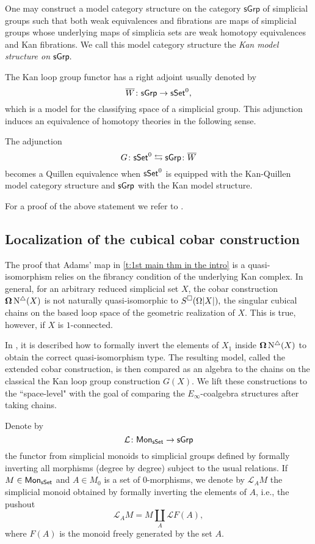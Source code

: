 One may construct a model category structure on the category $\mathsf{sGrp}$ of simplicial groups such that 
both weak equivalences and fibrations are maps of simplicial groups whose underlying maps of simplicia sets are weak homotopy equivalences and Kan fibrations. We call this model category structure the \textit{Kan model structure on $\mathsf{sGrp}.$}

The Kan loop group functor has a right adjoint usually denoted by 
$$\overline{W} \colon \mathsf{sGrp} \to \mathsf{sSet}^0,$$ which is a model for the classifying space of a simplicial group. This adjunction induces an equivalence of homotopy theories in the following sense.


\begin{theorem} \label{kan}
The adjunction
		$$G \colon \mathsf{sSet}^0 \leftrightarrows \mathsf{sGrp}\colon \overline{W}$$
		becomes a Quillen equivalence when $\mathsf{sSet}^0$ is equipped with the Kan-Quillen model category structure and $\mathsf{sGrp}$ with the Kan model structure.
\end{theorem}

For a proof of the above statement we refer to \cite[Chapter V]{goerss2009simplicial}.

\subsection{Localization of the cubical cobar construction}

The proof that Adams' map in \cref{t:1st main thm in the intro} is a quasi-isomorphism relies on the fibrancy condition of the underlying Kan complex. In general, for an arbitrary reduced simplicial set $X$, the cobar construction $\operatorname{\mathbf{\Omega}} \operatorname{N^{\triangle}}(X)$ is not naturally quasi-isomorphic to $S^{\square}(\Omega|X|),$ the singular cubical chains on the based loop space of the geometric realization of $X$. This is true, however, if $X$ is $1$-connected.

In \cite{hess2010cobar}, it is described how to formally invert the elements of $X_1$ inside $\operatorname{\mathbf{\Omega}} \operatorname{N^{\triangle}}(X)$ to obtain the correct quasi-isomorphism type. The resulting model, called the extended cobar construction, is then compared as an algebra to the chains on the classical the Kan loop group construction $G(X)$. We lift these constructions to the ``space-level" with the goal of comparing the $E_{\infty}$-coalgebra structures after taking chains. 

Denote by $$\mathcal{L} \colon \mathsf{Mon}_{\mathsf{sSet}} \to \mathsf{sGrp}$$ the functor from simplicial monoids to simplicial groups defined by formally inverting all morphisms (degree by degree) subject to the usual relations.
If $M \in \mathsf{Mon}_{\mathsf{sSet}}$ and $A \in M_0$ is a set of $0$-morphisms, we denote by $\mathcal{L}_AM$ the simplicial monoid obtained by formally inverting the elements of $A$, i.e., the pushout
$$\mathcal{L}_AM = M \coprod_{A} \mathcal{L}F(A),$$
where $F(A)$ is the monoid freely generated by the set $A$.

